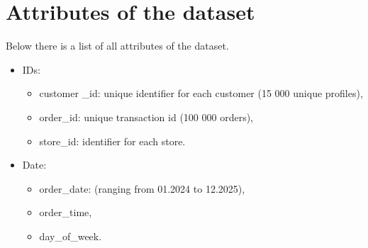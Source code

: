 \documentclass[12pt]{report}
\begin{document}
\section{Attributes of the dataset}
Below there is a list of all attributes of the dataset.
\begin{itemize}
    \item IDs:
          \begin{itemize}
              \item customer \_id: unique identifier for each customer (15 000 unique profiles),
              \item order\_id: unique transaction id (100 000 orders),
              \item store\_id: identifier for each store.
          \end{itemize}
\end{itemize}
\begin{itemize}
    \item Date:
          \begin{itemize}
              \item order\_date: (ranging from 01.2024 to 12.2025),
              \item order\_time,
              \item day\_of\_week.
          \end{itemize}
\end{itemize}
\end{document}
